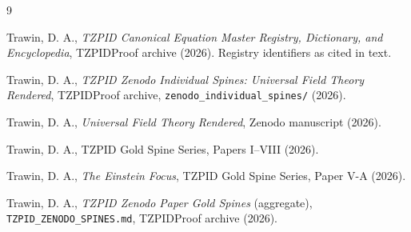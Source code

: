 \documentclass[11pt]{article}
\theoremstyle{remark}
\begin{document}
\begin{thebibliography}{9}

 Trawin, D. A., \emph{TZPID Canonical Equation Master Registry, Dictionary, and Encyclopedia}, TZPIDProof archive (2026). Registry identifiers as cited in text.

 Trawin, D. A., \emph{TZPID Zenodo Individual Spines: Universal Field Theory Rendered}, TZPIDProof archive, \texttt{zenodo\_individual\_spines/} (2026).

 Trawin, D. A., \emph{Universal Field Theory Rendered}, Zenodo manuscript (2026).

 Trawin, D. A., TZPID Gold Spine Series, Papers I--VIII (2026).

 Trawin, D. A., \emph{The Einstein Focus}, TZPID Gold Spine Series, Paper V-A (2026).

 Trawin, D. A., \emph{TZPID Zenodo Paper Gold Spines} (aggregate), \texttt{TZPID\_ZENODO\_SPINES.md}, TZPIDProof archive (2026).

\end{thebibliography}
\end{document}

